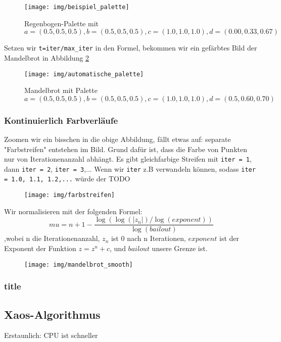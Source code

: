 \documentclass{article}
\begin{document}
\begin{figure}[!htb]
\centering
\texttt{[image: img/beispiel\_palette]}
\caption{Regenbogen-Palette mit $a=(0.5,0.5,0.5), b=(0.5, 0.5, 0.5), c=(1.0, 1.0, 1.0), d=(0.00, 0.33, 0.67)$}
\label{fig:beispielpalette}
\end{figure}

Setzen wir \lstinline|t=iter/max_iter| in den Formel, bekommen wir ein gefärbtes Bild der Mandelbrot in Abbildung \ref{fig:mandelbrot_palette}

\begin{figure}
\centering
\texttt{[image: img/automatische\_palette]}
\caption{Mandelbrot mit Palette $a=(0.5,0.5,0.5), b=(0.5,0.5,0.5),c=(1.0,1.0,1.0),d=(0.5,0.60,0.70)$}
\label{fig:mandelbrot_palette}
\end{figure}

\subsubsection{Kontinuierlich Farbverläufe}
Zoomen wir ein bisschen in die obige Abbildung, fällt etwas auf: separate "Farbstreifen" entstehen im Bild. Grund dafür ist, dass die Farbe von Punkten nur von Iterationenanzahl abhängt. Es gibt gleichfarbige Streifen mit \lstinline|iter = 1|, dann \lstinline|iter = 2|, \lstinline|iter = 3|,... Wenn wir \lstinline|iter| z.B verwandeln können, sodass \lstinline|iter = 1.0, 1.1, 1.2,...| würde der TODO

\begin{figure}
\centering
\texttt{[image: img/farbstreifen]}
\caption{}
\label{fig:farbstreifen}
\end{figure}
Wir normalisieren mit der folgenden Formel:
$$mu = n + 1 - \frac{\log(\log(|z_n|) / \log(exponent))}{\log(bailout)} $$
,wobei n die Iterationenanzahl, $z_n$ ist 0 nach n Iterationen, $exponent$ ist der Exponent der Funktion $z= z^n + c$, und $bailout$ unsere Grenze ist.

\begin{figure}
\centering
\texttt{[image: img/mandelbrot\_smooth]}
\caption{}
\label{fig:mandelbrot_smooth}
\end{figure}


\subsubsection{title}

\subsection{Xaos-Algorithmus}
Erstaunlich: CPU ist schneller
\end{document}
